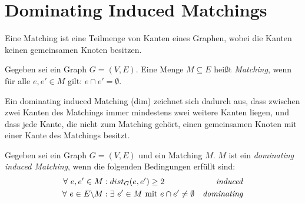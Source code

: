 {{}
\hspace*{\fill}
}

\section{Dominating Induced Matchings}
Eine Matching ist eine Teilmenge von Kanten eines Graphen, wobei die Kanten keinen gemeinsamen Knoten besitzen.

\begin{mydef}[Matching]
Gegeben sei ein Graph $G=(V,E)$. Eine Menge $M \subseteq E$ heißt \emph{Matching}, wenn für alle $e,e' \in M$ gilt: $e\cap e' = \emptyset$.
\end{mydef}

Ein dominating induced Matching (dim) zeichnet sich dadurch aus, dass zwischen zwei Kanten des Matchings immer mindestens zwei weitere Kanten liegen, und dass jede Kante, die nicht zum Matching gehört, einen gemeinsamen Knoten mit einer Kante des Matchings besitzt.

\begin{mydef}
Gegeben sei ein Graph $G=(V,E)$ und ein Matching $M$. $M$ ist ein \emph{dominating induced Matching}, wenn die folgenden Bedingungen erfüllt sind:
\begin{align*}
 \forall\ e,e' \in M&: dist_G(e,e') \geq 2 & \text{\emph{induced}} \\
 \forall\ e \in E \backslash M &: \exists\ e' \in M \text{ mit } e\cap e' \neq \emptyset & \text{\emph{dominating}}
\end{align*}
\end{mydef}

